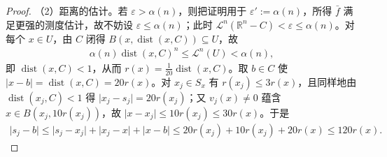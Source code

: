 \documentclass[../../main.tex]{subfiles}%
\begin{document}
\begin{proof}
（2）距离的估计。若 $\varepsilon>\alpha(n)$，则把证明用于 $\varepsilon':=\alpha(n)$，所得 $\bar f$ 满足更强的测度估计，故不妨设 $\varepsilon\le\alpha(n)$；此时 $\mathcal{L}^n(\mathbb{R}^n-C)<\varepsilon\le\alpha(n)$。对每个 $x\in U$，由 $C$ 闭得 $B(x,\operatorname{dist}(x,C))\subseteq U$，故
\begin{align*}
\alpha(n)\operatorname{dist}(x,C)^n\le\mathcal{L}^n(U)<\alpha(n),
\end{align*}
即 $\operatorname{dist}(x,C)<1$，从而 $r(x)=\frac{1}{20}\operatorname{dist}(x,C)$。取 $b\in C$ 使 $\lvert x-b\rvert=\operatorname{dist}(x,C)=20r(x)$。对 $x_j\in S_x$ 有 $r(x_j)\le3r(x)$，且同样地由 $\operatorname{dist}(x_j,C)<1$ 得 $\lvert x_j-s_j\rvert=20r(x_j)$；又 $v_j(x)\ne0$ 蕴含 $x\in B(x_j,10r(x_j))$，故 $\lvert x-x_j\rvert\le10r(x_j)\le30r(x)$。于是
\begin{align*}
\lvert s_j-b\rvert\le\lvert s_j-x_j\rvert+\lvert x_j-x\rvert+\lvert x-b\rvert\le20r(x_j)+10r(x_j)+20r(x)\le120r(x).
\end{align*}


\end{proof}
\end{document}
